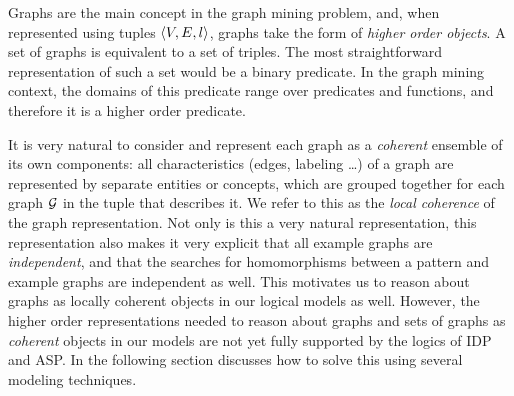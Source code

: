 Graphs are the main concept in the graph mining problem, and, when represented using  tuples $\langle V,E,l \rangle$, graphs take the form of \emph{higher order objects}.
A set of graphs is equivalent to a set of triples.
The most straightforward representation of such a set would be a binary predicate.
In the graph mining context, the domains of this predicate range over predicates and functions, and therefore it is a higher order predicate.

It is very natural to consider and represent each graph as a \emph{coherent} ensemble of its own components: all characteristics (edges, labeling \ldots) of a graph are represented by separate entities or concepts, which are grouped together for each graph $\mathcal{G}$ in the tuple that describes it. We refer to this as the \emph{local coherence} of the graph representation.
Not only is this a very natural representation, this representation also makes it very explicit that all example graphs are \emph{independent}, and that the searches for homomorphisms between a pattern and example graphs are independent as well.
This motivates us to reason about graphs as locally coherent objects in our logical models as well.
However, the higher order representations needed to reason about graphs and sets of graphs as \emph{coherent} objects in our models are not yet fully supported by the logics of IDP and ASP.
In the following section discusses how to solve this using several modeling techniques.




